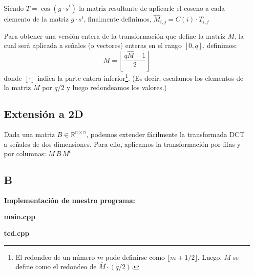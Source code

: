 \documentclass[10pt, a4paper]{article}
\newcommand{\real}{\mathbb{R}}
\begin{document}
\begin{itemize}
Siendo $T=\cos(g\cdot s^t)$ la matriz resultante de aplicarle el coseno a cada elemento de la matriz $g\cdot s^t$,
finalmente definimos, $\widehat{M}_{i,j} = C(i) \cdot T_{i,j}$

Para obtener una versi\'on entera de la transformaci\'on que define la matriz $M$, la cual ser\'a aplicada a se\~nales (o vectores) enteras en el rango $[0,q]$, definimos:
\begin{equation}
M = \left\lfloor \frac{q \widehat{M} + 1}{2}  \right\rfloor \label{eq:dctint}
\end{equation} 
donde $\left\lfloor\cdot\right\rfloor$ indica la parte entera inferior\footnote{El redondeo de un n\'umero $m$ pude definirse como $\lfloor m + 1/2 \rfloor$. Luego, $M$ se define como el redondeo de $\widehat{M}\cdot(q/2)$.}. (Es decir, escalamos los elementos de la matriz $M$ por $q/2$ y luego redondeamos los valores.)

\subsection{Extensi\'on a 2D}\label{sec:dct2d}
Dada una matriz $B\in\real^{n\times n}$, podemos extender f\'acilmente la transformada DCT a se\~nales de dos dimensiones. Para ello, aplicamos la transformaci\'on por filas y por columnas: $ M\, B\, M^t $

\end{itemize}
\subsection{B}

\large{\textbf{Implementaci\'on de nuestro programa:}}\newline

\centerline{\large{\textbf{main.cpp}}}




\centerline{\large{\textbf{tcd.cpp}}}

\end{document}
